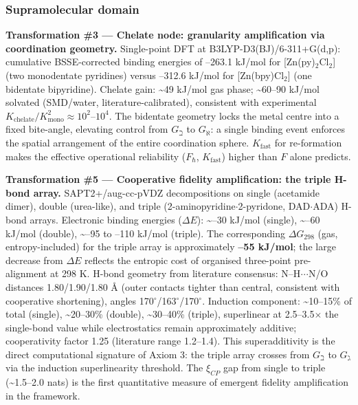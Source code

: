 \documentclass[12pt,a4paper]{article}
\begin{document}
\subsubsection{Supramolecular domain}

\textbf{Transformation \#3 --- Chelate node: granularity amplification via coordination geometry.} Single-point DFT at B3LYP-D3(BJ)/6-311+G(d,p): cumulative BSSE-corrected binding energies of --263.1 kJ/mol for {[}Zn(py)$_2$Cl$_2${]} (two monodentate pyridines) versus --312.6 kJ/mol for {[}Zn(bpy)Cl$_2${]} (one bidentate bipyridine). Chelate gain: \textasciitilde{}49 kJ/mol gas phase; \textasciitilde{}60--90 kJ/mol solvated (SMD/water, literature-calibrated), consistent with experimental $K_{\text{chelate}}/K_{\text{mono}}^2 \approx 10^2$--$10^4$. The bidentate geometry locks the metal centre into a fixed bite-angle, elevating control from $G_{\beth}$ to $G_{\aleph}$: a single binding event enforces the spatial arrangement of the entire coordination sphere. $K_{\text{fast}}$ for re-formation makes the effective operational reliability ($F_{\hbar}$, $K_{\text{fast}}$) higher than $F$ alone predicts.

\textbf{Transformation \#5 --- Cooperative fidelity amplification: the triple H-bond array.} SAPT2+/aug-cc-pVDZ decompositions on single (acetamide dimer), double (urea-like), and triple (2-aminopyridine$\cdot$2-pyridone, DAD$\cdot$ADA) H-bond arrays. Electronic binding energies ($\Delta E$): \textasciitilde{}--30 kJ/mol (single), \textasciitilde{}--60 kJ/mol (double), \textasciitilde{}--95 to --110 kJ/mol (triple). The corresponding $\Delta G_{298}$ (gas, entropy-included) for the triple array is approximately \textbf{--55 kJ/mol}; the large decrease from $\Delta E$ reflects the entropic cost of organised three-point pre-alignment at 298 K. H-bond geometry from literature consensus: N--H$\cdot$$\cdot$$\cdot$N/O distances 1.80/1.90/1.80 Å (outer contacts tighter than central, consistent with cooperative shortening), angles 170$^{\circ}$/163$^{\circ}$/170$^{\circ}$. Induction component: \textasciitilde{}10--15\% of total (single), \textasciitilde{}20--30\% (double), \textasciitilde{}30--40\% (triple), superlinear at 2.5--3.5$\times$ the single-bond value while electrostatics remain approximately additive; cooperativity factor 1.25 (literature range 1.2--1.4). This superadditivity is the direct computational signature of Axiom 3: the triple array crosses from $G_{\beth}$ to $G_{\gimel}$ via the induction superlinearity threshold. The $\xi_{CP}$ gap from single to triple (\textasciitilde{}1.5--2.0 nats) is the first quantitative measure of emergent fidelity amplification in the framework.
\end{document}

